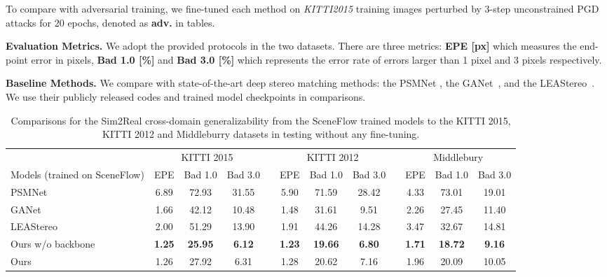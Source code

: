 \documentclass[10pt,twocolumn,letterpaper]{article}
\begin{document}
To compare with adversarial training, we fine-tuned each method on \textit{KITTI2015} training images perturbed by 3-step unconstrained PGD attacks for 20 epochs, denoted as \textbf{adv.} in tables.

\textbf{Evaluation Metrics.} We adopt the provided protocols in the two datasets. There are three metrics: \textbf{EPE [px] } which measures the end-point error in pixels, \textbf{Bad 1.0 [\%]}  and \textbf{Bad 3.0 [\%]} which represents the error rate of errors larger than 1 pixel and 3 pixels respectively. 

\textbf{Baseline Methods.} We compare with state-of-the-art deep stereo matching methods: the PSMNet \cite{chang2018pyramid}, the GANet~\cite{GANet}, and the LEAStereo~\cite{LEAStereo}. We use their publicly released codes and trained model checkpoints in comparisons. 

\begin{table*}%
\begin{center}
{\small
\begin{tabular*}{0.95\textwidth}{@{\extracolsep{\fill}}lccccccccccc}
\toprule
&\multicolumn{3}{c}{KITTI 2015} && \multicolumn{3}{c}{KITTI 2012} && \multicolumn{3}{c}{Middlebury}  \\ 
\cline{2-4} \cline{6-8} \cline{10-12}
Models (trained on SceneFlow) & EPE & Bad 1.0 & Bad 3.0 && EPE & Bad 1.0 & Bad 3.0 && EPE & Bad 1.0 & Bad 3.0\\
\midrule

PSMNet & 6.89 & 72.93 & 31.55 && 5.90 & 71.59 & 28.42 && 4.33 & 73.01 & 19.01\\
GANet & 1.66 & 42.12 & 10.48 && 1.48 & 31.61 & 9.51 && 2.26 & 27.45 & 11.40\\
LEAStereo & 2.00 & 51.29 & 13.90 && 1.91 & 44.26 & 14.28 && 3.47 & 32.67 & 14.81\\
\cline{2-4} \cline{6-8} \cline{10-12}
Ours w/o backbone & \textbf{1.25} & \textbf{25.95} & \textbf{6.12} && \textbf{1.23} & \textbf{19.66} & \textbf{6.80} && \textbf{1.71} & \textbf{18.72} & \textbf{9.16} \\
Ours & 1.26 & 27.92 & 6.31 && 1.28 & 20.62 & 7.16 && 1.96 & 20.09 & 10.05 \\
\bottomrule
\end{tabular*}}
\end{center}
\caption{Comparisons for the Sim2Real cross-domain generalizability from the SceneFlow trained models to the KITTI 2015, KITTI 2012 and Middleburry datasets in testing without any fine-tuning.}
\label{table:cross_domain}
\end{table*}
\end{document}
